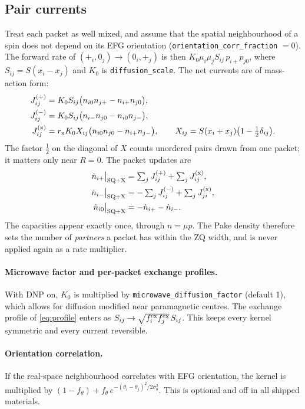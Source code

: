\documentclass[11pt]{article}
\newcommand{\code}[1]{\texttt{#1}}
\begin{document}
\subsection{Pair currents}
\label{sec:paircurrents}

Treat each packet as well mixed, and assume that the spatial neighbourhood of a spin does not
depend on its EFG orientation (\code{orientation\_corr\_fraction} \(=0\)). The forward rate of
\((+_i,0_j)\to(0_i,+_j)\) is then \(K_0\mu_i\mu_jS_{ij}\,p_{i+}p_{j0}\), where
\(S_{ij}=S(x_i-x_j)\) and \(K_0\) is \code{diffusion\_scale}. The net currents are of mass-action
form:
\begin{align}
J^{(+)}_{ij}&=K_0 S_{ij}\bigl(n_{i0}n_{j+}-n_{i+}n_{j0}\bigr),\label{eq:Jsp}\\
J^{(-)}_{ij}&=K_0 S_{ij}\bigl(n_{i-}n_{j0}-n_{i0}n_{j-}\bigr),\label{eq:Jsm}\\
J^{({\rm x})}_{ij}&=r_{\rm x}K_0 X_{ij}\bigl(n_{i0}n_{j0}-n_{i+}n_{j-}\bigr),\qquad
X_{ij}=S(x_i+x_j)\bigl(1-\tfrac12\delta_{ij}\bigr).\label{eq:Jx}
\end{align}
The factor \(\tfrac12\) on the diagonal of \(X\) counts unordered pairs drawn from one packet; it
matters only near \(R=0\). The packet updates are
\begin{align}
\dot n_{i+}\big|_{\rm SQ+X} &= \textstyle\sum_j J^{(+)}_{ij}+\sum_jJ^{({\rm x})}_{ij},\notag\\
\dot n_{i-}\big|_{\rm SQ+X} &= \textstyle-\sum_j J^{(-)}_{ij}+\sum_jJ^{({\rm x})}_{ji},\label{eq:diffpops}\\
\dot n_{i0}\big|_{\rm SQ+X} &= -\dot n_{i+}-\dot n_{i-}.\notag
\end{align}
The capacities appear exactly once, through \(n=\mu p\). The Pake density therefore sets the
number of \emph{partners} a packet has within the ZQ width, and is never applied again as a rate
multiplier.

\paragraph{Microwave factor and per-packet exchange profiles.} With DNP on, \(K_0\) is
multiplied by \code{microwave\_diffusion\_factor} (default 1), which allows for diffusion
modified near paramagnetic centres. The exchange profile of \cref{eq:profile} enters as
\(S_{ij}\to\sqrt{f^{\rm ex}_if^{\rm ex}_j}\,S_{ij}\). This keeps every kernel symmetric and every
current reversible.

\paragraph{Orientation correlation.} If the real-space neighbourhood correlates with EFG
orientation, the kernel is multiplied by
\((1-f_\theta)+f_\theta\,e^{-(\theta_i-\theta_j)^2/2\sigma_\theta^2}\). This is optional and off
in all shipped materials.
\end{document}

